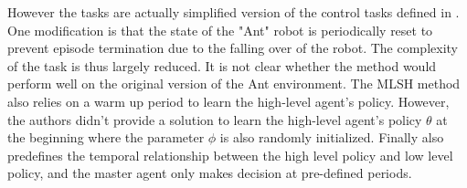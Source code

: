 However the tasks are actually simplified version of the control tasks defined in \cite{duan2016benchmarking}. One modification is that the state of the "Ant" robot is periodically reset to prevent episode termination due to the falling over of the robot. The complexity of the task is thus largely reduced. It is not clear whether the method would perform well on the original version of the Ant environment.
The MLSH method also relies on a warm up period to learn the high-level agent's policy. However, the authors didn't provide a solution to learn the high-level agent's policy $\theta$ at the beginning where the parameter $\phi$ is also randomly initialized.
Finally also predefines the temporal relationship between the high level policy and low level policy, and the master agent only makes decision at pre-defined periods.
